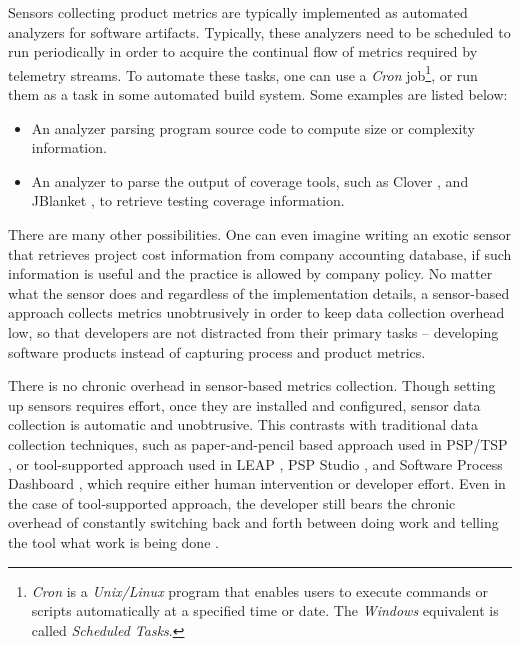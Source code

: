 Sensors collecting product metrics are typically implemented as automated analyzers for software artifacts. Typically, these analyzers need to be scheduled to run periodically in order to acquire the continual flow of metrics required by telemetry streams. To automate these tasks, one can use a \textit{Cron} job\footnote{\textit{Cron} is a \textit{Unix/Linux} program that enables users to execute commands or scripts automatically at a specified time or date. The \textit{Windows} equivalent is called \textit{Scheduled Tasks}.}, or run them as a task in some automated build system. Some examples are listed below:

\begin{itemize}

	\item An analyzer parsing program source code to compute size or complexity information.
	
	\item An analyzer to parse the output of coverage tools, such as Clover \cite{Software:Clover}, and JBlanket \cite{Software:JBlanket}, to retrieve testing coverage information.

\end{itemize}



There are many other possibilities. One can even imagine writing an exotic sensor that retrieves project cost information from company accounting database, if such information is useful and the practice is allowed by company policy. No matter what the sensor does and regardless of the implementation details, a sensor-based approach collects metrics unobtrusively in order to keep data collection overhead low, so that developers are not distracted from their primary tasks -- developing software products instead of capturing process and product metrics.



There is no chronic overhead in sensor-based metrics collection. Though setting up sensors requires effort, once they are installed and configured, sensor data collection is automatic and unobtrusive. This contrasts with traditional data collection techniques, such as paper-and-pencil based approach used in PSP/TSP \cite{Humphrey:1995}, or tool-supported approach used in LEAP \cite{Moore:1999}, PSP Studio \cite{PspStudio:1997}, and Software Process Dashboard \cite{PspDashboard:2000}, which require either human intervention or developer effort. Even in the case of tool-supported approach, the developer still bears the chronic overhead of constantly switching back and forth between doing work and telling the tool what work is being done \cite{Johnson:2001, Johnson:2003}.

